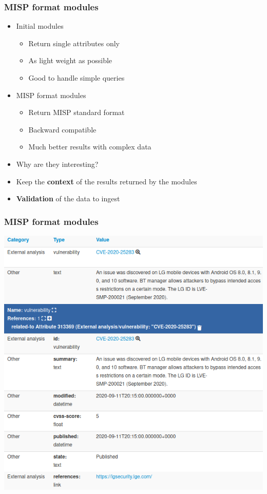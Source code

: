 \begin{frame}
\frametitle{MISP format modules}
\begin{itemize}
    \item Initial modules
    \begin{itemize}
        \item Return single attributes only
        \item As light weight as possible
        \item Good to handle simple queries
    \end{itemize}
    \item MISP format modules
    \begin{itemize}
        \item Return MISP standard format
        \item Backward compatible
        \item Much better results with complex data
    \end{itemize}
\end{itemize}
\pause
\begin{itemize}
    \item Why are they interesting?
    \pause
    \item Keep the {\bf context} of the results returned by the modules
    \item {\bf Validation} of the data to ingest
\end{itemize}
\end{frame}

\begin{frame}
\frametitle{MISP format modules}
\begin{center}
    \includegraphics[width=0.7\linewidth]{cve_module.png}
\end{center}
\end{frame}

